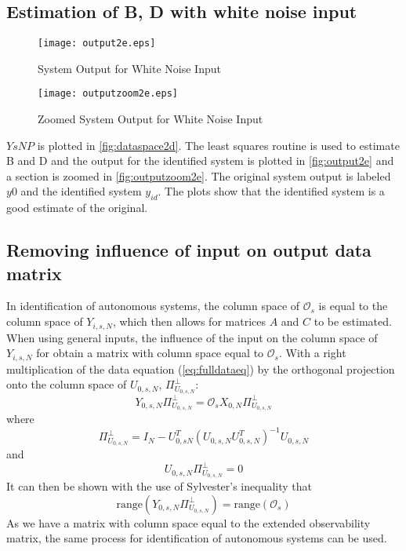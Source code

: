 \documentclass[11pt,a4paper]{article}
\begin{document}
\subsection{Estimation of B, D with white noise input}
\begin{figure}
    \centering
    \texttt{[image: output2e.eps]}
    \caption{System Output for White Noise Input}
    \label{fig:output2e}
\end{figure}
\begin{figure}
    \centering
    \texttt{[image: outputzoom2e.eps]}
    \caption{Zoomed System Output for White Noise Input}
    \label{fig:outputzoom2e}
\end{figure}
$YsNP$ is plotted in \autoref{fig:dataspace2d}. The least squares routine is used
to estimate B and D and the output for the identified system is plotted in
\autoref{fig:output2e} and a section is zoomed in \autoref{fig:outputzoom2e}.
The original system output is labeled $y0$ and the identified system $y_{id}$.
The plots show that the identified system is a good estimate of the original.

\subsection{Removing influence of input on output data matrix}
In identification of autonomous systems, the column space of $\mathcal{O}_s$ is
equal to the column space of $Y_{i, s, N}$, which then allows for matrices $A$
and $C$ to be estimated. When using general inputs, the influence of the input
on the column space of $Y_{i, s, N}$ for obtain a matrix with column space
equal to $\mathcal{O}_s$. With a right multiplication of the data equation
(\autoref{eq:fulldataeq}) by the orthogonal projection onto the column space of
$U_{0, s, N}$, $\Pi^\perp_{U_{0,s,N}}$:
\begin{equation}
    \label{eq:yuperp}
    Y_{0, s, N} \Pi^\perp_{U_{0,s,N}} =
        \mathcal{O}_s X_{0, N} \Pi^\perp_{U_{0,s,N}} 
\end{equation}
where 
\begin{equation}
    \label{eq:uoperp}
    \Pi^\perp_{U_{0,s,N}} =
        I_N - U^T_{0,s N}(U_{0, s, N}U^T_{0,s,N})^{-1} U_{0,s,N}
\end{equation}
and
\begin{equation*}
    U_{0,s,N} \Pi^\perp_{U_{0,s,N}} = 0
\end{equation*}
It can then be shown with the use of Sylvester's inequality that
\begin{equation*}
    \text{range}(Y_{0,s,N} \Pi^\perp_{U_{0,s,N}}) =
        \text{range}(\mathcal{O}_s)
\end{equation*}
As we have a matrix with column space equal to the extended observability
matrix, the same process for identification of autonomous systems can be used.
\end{document}
